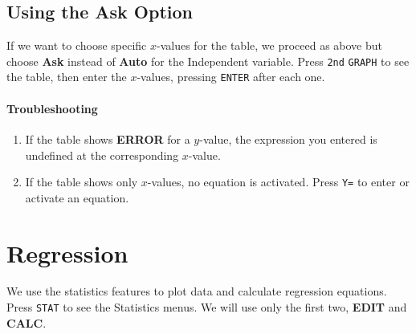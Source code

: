 \documentclass[10pt,]{book}
\newcommand{\terminology}[1]{\textbf{#1}}
\theoremstyle{plain}
\theoremstyle{definition}
\theoremstyle{definition}
\theoremstyle{definition}
\numberwithin{equation}{part}
\begin{document}
\subsection[{Using the Ask Option}]{Using the Ask Option}\label{subsection-83}
If we want to choose specific \(x\)-values for the table, we proceed as above but choose \terminology{Ask} instead of \terminology{Auto} for the Independent variable. Press \lstinline?2nd? \lstinline?GRAPH? to see the table, then enter the \(x\)-values, pressing \lstinline?ENTER? after each one.%
\typeout{************************************************}
\typeout{************************************************}
\paragraph[{Troubleshooting}]{Troubleshooting}\hypertarget{paragraphs-4}{}
\leavevmode%
\begin{enumerate}[label=*\arabic**]
\item\hypertarget{li-439}{}If the table shows \terminology{ERROR} for a \(y\)-value, the expression you entered is undefined at the corresponding \(x\)-value.%
\item\hypertarget{li-440}{}If the table shows only \(x\)-values, no equation is activated. Press \lstinline?Y=? to enter or activate an equation.%
\end{enumerate}
%
\typeout{************************************************}
\typeout{************************************************}
\section[{Regression}]{Regression}\label{appendix-Regression}
We use the statistics features to plot data and calculate regression equations. Press \lstinline?STAT? to see the Statistics menus. We will use only the first two, \terminology{EDIT} and \terminology{CALC}.%
\typeout{************************************************}
\typeout{************************************************}
\end{document}
